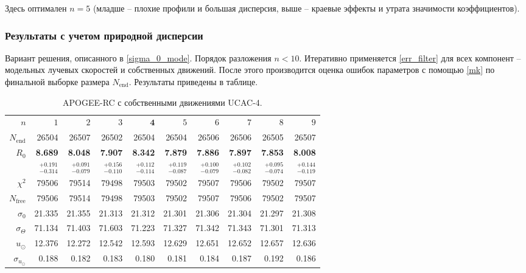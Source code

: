 \documentclass{matmex-diploma-custom}
\begin{document}
Здесь оптимален $n = 5$ (младше -- плохие профили и большая дисперсия, выше -- краевые эффекты и утрата значимости коэффициентов).

\pagebreak

\subsubsection{Результаты с учетом природной дисперсии}
Вариант решения, описанного в \ref{sigma_0_mode}. Порядок разложения $n < 10$. Итеративно применяется \ref{err_filter} для всех компонент -- модельных лучевых скоростей и собственных движений. После этого производится оценка ошибок параметров с помощью \ref{mk} по финальной выборке размера $N_{\mathrm{end}}$. Результаты приведены в таблице. 
\begin{table}[h!!]
\centering
\caption{APOGEE-RC с собственными движениями UCAC-4.}
\begin{tabular}{r|rrr|rrr|rrr}
\hline
$n$ & $1$ & $2$ & $3$ & $\textbf{4}$ & $5$&$ 6 $&$ 7 $&$ 8 $&$ 9 $\\
 $N_{\mathrm{end}}$ & 26504       &   26507 &   26502 &   26504 &   26504 &   26506 &   26506 &   26505 &   26507 \\
 $R_0 $& \textbf{8.689}       &   \textbf{8.048} &   \textbf{7.907} &   \textbf{8.342} &   \textbf{7.879} &   \textbf{7.886} &   \textbf{7.897} &   \textbf{7.853} &   \textbf{8.008} \\
       & $_{-0.314}^{+0.191} $ & $_{-0.079}^{+0.091}$ & $_{-0.110}^{+0.156}$   & $_{-0.114}^{+0.112}$  & $_{-0.087}^{+0.119}$  & $_{-0.079}^{+0.100}$  & $_{-0.082}^{+0.102}$  & $_{-0.074}^{+0.095}$  & $_{-0.119}^{+0.144}$  \\\hline
 $\chi^2 $& 79506   &   79514 &   79498 &   79503 &   79502 &   79507 &   79506 &   79502 &   79507 \\
 $N_{\mathrm{free}} $& 79506      &  79514 &   79498 &   79503 &   79502 &   79507 &   79506 &   79502 &   79507 \\
 $\sigma_0 $& 21.335      &  21.355 &  21.313 &  21.312 &  21.301 &  21.306 &  21.304 &  21.297 &  21.308  \\ 
 $\sigma_{\Theta} $& 71.134      &  71.403 &  71.603 &  71.223 &  71.327 &  71.342 &  71.343 &  71.301 &  71.313  \\\hline 
 $ u_{\odot} $& 12.376      &  12.272 &  12.542 &  12.593 &  12.629 &  12.651 &  12.652 &  12.657 &  12.636 \\
 $\sigma_{u_{\odot}} $&0.188       &   0.182 &   0.183 &    0.180 &   0.181 &   0.184 &   0.187 &   0.192 &   0.186 \\

\end{tabular}
\end{table}
\end{document}
